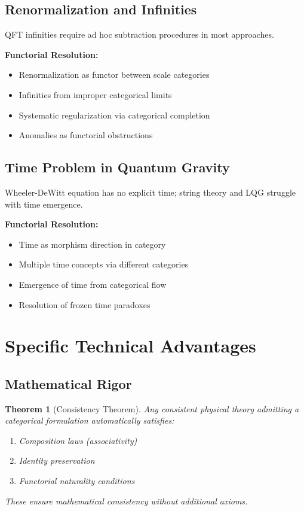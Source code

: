 \documentclass[11pt,a4paper]{article}
\newtheorem{theorem}{Theorem}
\begin{document}
\subsection{Renormalization and Infinities}

QFT infinities require ad hoc subtraction procedures in most approaches.

\textbf{Functorial Resolution:}
\begin{itemize}
    \item Renormalization as functor between scale categories
    \item Infinities from improper categorical limits
    \item Systematic regularization via categorical completion
    \item Anomalies as functorial obstructions
\end{itemize}

\subsection{Time Problem in Quantum Gravity}

Wheeler-DeWitt equation has no explicit time; string theory and LQG struggle with time emergence.

\textbf{Functorial Resolution:}
\begin{itemize}
    \item Time as morphism direction in category
    \item Multiple time concepts via different categories
    \item Emergence of time from categorical flow
    \item Resolution of frozen time paradoxes
\end{itemize}

\section{Specific Technical Advantages}

\subsection{Mathematical Rigor}

\begin{theorem}[Consistency Theorem]
Any consistent physical theory admitting a categorical formulation automatically satisfies:
\begin{enumerate}
    \item Composition laws (associativity)
    \item Identity preservation
    \item Functorial naturality conditions
\end{enumerate}
These ensure mathematical consistency without additional axioms.
\end{theorem}
\end{document}
